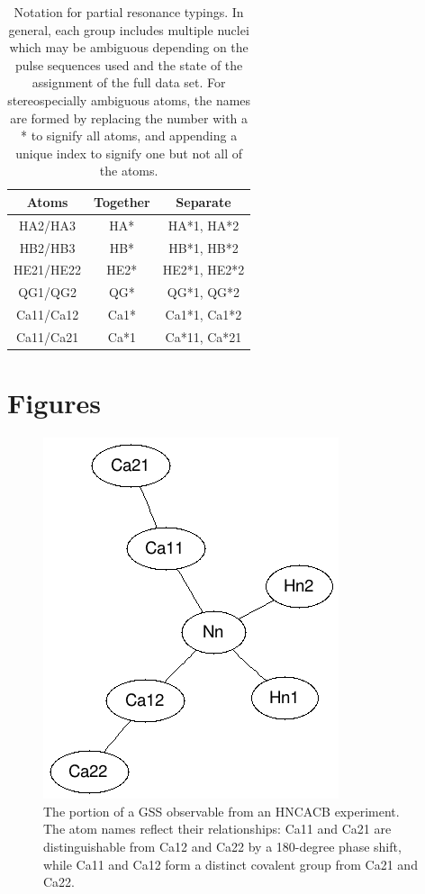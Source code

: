 \begin{table}
  \begin{tabular}{ | c | c | c |}
    \hline
    Atoms       &  Together &  Separate      \\  \hline 
    HA2/HA3     &  HA*      &  HA*1, HA*2    \\  \hline 
    HB2/HB3     &  HB*      &  HB*1, HB*2    \\  \hline 
    HE21/HE22   &  HE2*     &  HE2*1, HE2*2  \\  \hline 
    QG1/QG2     &  QG*      &  QG*1, QG*2    \\  \hline
    Ca11/Ca12   &  Ca1*     &  Ca1*1, Ca1*2  \\  \hline
    Ca11/Ca21   &  Ca*1     &  Ca*11, Ca*21  \\  \hline
  \end{tabular}
  \caption[Notation for partial resonance typings.]
          {Notation for partial resonance typings.
           In general, each group includes multiple nuclei which may be 
           ambiguous depending on the pulse sequences used and the 
           state of the assignment of the full data set.
           For stereospecially ambiguous atoms, the names are formed by
           replacing the number with a * to signify all atoms, and appending
           a unique index to signify one but not all of the atoms.}
  \label{partial_typing_notation}
\end{table}


\clearpage
\section{Figures}

\begin{figure}[h]
  \includegraphics[scale=0.75]{figures/generic_hncacb}
  \caption[The portion of a GSS observable from an HNCACB experiment.]
          {The portion of a GSS observable from an HNCACB experiment.
           The atom names reflect their relationships: Ca11 and Ca21 are
           distinguishable from Ca12 and Ca22 by a 180-degree phase shift,
           while Ca11 and Ca12 form a distinct covalent group from Ca21 and Ca22.}
  \label{generic_hncacb}
\end{figure}    

